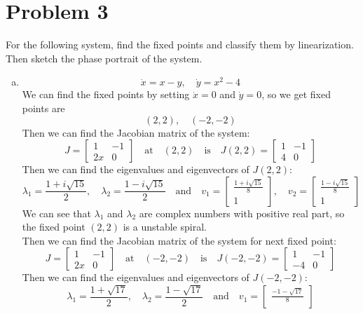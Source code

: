 \documentclass[12pt]{exam}
\begin{document}
\section*{Problem 3}
For the following system, find the fixed points and classify them by linearization. Then sketch the phase portrait of the system.

\begin{enumerate}[(a)]
	\item \[ \dot{x} = x-y, \quad \dot{y} = x^2-4 \]
	We can find the fixed points by setting $\dot{x} = 0$ and $\dot{y} = 0$, so we get fixed points are
	\[ (2,2), \quad (-2,-2) \]
	Then we can find the Jacobian matrix of the system:
	\[ J = \begin{bmatrix}
		1 & -1 \\
		2x & 0
		\end{bmatrix} \quad \text{at} \quad (2,2) \quad \text{is} \quad J(2,2) = \begin{bmatrix}		1 & -1 \\
		4 & 0
		\end{bmatrix} \]
	Then we can find the eigenvalues and eigenvectors of $J(2,2)$:
	\[ \lambda_1 = \frac{1+i\sqrt{15}}{2}, \quad \lambda_2 = \frac{1-i\sqrt{15}}{2} \quad \text{and} \quad v_1 = \begin{bmatrix}
		\frac{1+i\sqrt{15}}{8} \\
		1
	\end{bmatrix}, \quad v_2 = \begin{bmatrix}
		\frac{1-i\sqrt{15}}{8} \\
		1
	\end{bmatrix} \]
	We can see that $\lambda_1$ and $\lambda_2$ are complex numbers with positive real part, so the fixed point $(2,2)$ is a unstable spiral. \\
	Then we can find the Jacobian matrix of the system for next fixed point:
	\[ J = \begin{bmatrix}
		1 & -1 \\
		2x & 0
		\end{bmatrix} \quad \text{at} \quad (-2,-2) \quad \text{is} \quad J(-2,-2) = \begin{bmatrix}		1 & -1 \\
		-4 & 0
		\end{bmatrix} \]
	Then we can find the eigenvalues and eigenvectors of $J(-2,-2)$:
	\[ \lambda_1 = \frac{1+\sqrt{17}}{2}, \quad \lambda_2 = \frac{1-\sqrt{17}}{2} \quad \text{and} \quad v_1 = \begin{bmatrix}
		\frac{-1-\sqrt{17}}{8} \\

\end{bmatrix}\]
\end{enumerate}
\end{document}
